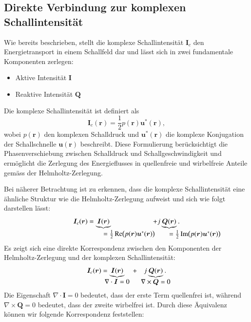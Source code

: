 \subsection{Direkte Verbindung zur komplexen Schallintensität
\label{helmholtz:subsection:Zerlegung_Schallschnelle}}
Wie bereits beschrieben, stellt die komplexe Schallintensität
$\boldsymbol{I}_c$ den Energietransport in einem Schallfeld dar und
lässt sich in zwei fundamentale Komponenten zerlegen:
\begin{itemize}
\item Aktive Intensität $\boldsymbol{I}$
\item Reaktive Intensität $\boldsymbol{Q}$
\end{itemize}
Die komplexe Schallintensität ist definiert als
\begin{equation}
\boldsymbol{I}_c (\boldsymbol{r})
=
\frac{1}{2} p(\boldsymbol{r})  \boldsymbol{u}^{*}(\boldsymbol{r}),
\end{equation}
wobei $p(\boldsymbol{r})$ den komplexen Schalldruck und $\boldsymbol{u}^{*}(\boldsymbol{r})$ die komplexe Konjugation der Schallschnelle $\boldsymbol{u}(\boldsymbol{r})$ beschreibt. Diese Formulierung berücksichtigt die Phasenverschiebung zwischen Schalldruck und Schallgeschwindigkeit und ermöglicht die Zerlegung des Energieflusses in quellenfreie und wirbelfreie Anteile gemäss der Helmholtz-Zerlegung.
 
Bei näherer Betrachtung ist zu erkennen, dass die komplexe Schallintensität eine ähnliche Struktur wie die Helmholtz-Zerlegung aufweist und sich wie folgt darstellen lässt:
\begin{equation}
\boldsymbol{I}_c (\boldsymbol{r})
=
\underbrace{
\boldsymbol{I}(\boldsymbol{r})
}_{\mathstrut
\rlap{$
=\textstyle\frac{1}{2}
\operatorname{Re} \bigl( p(\boldsymbol{r}) \boldsymbol{u}^*(\boldsymbol{r}) \bigr)
$}
}
\qquad\qquad
\qquad
+
j\underbrace{
\boldsymbol{Q}(\boldsymbol{r})
}_{\mathstrut
\rlap{$\textstyle
=\frac{1}{2}
\operatorname{Im} \bigl( p(\boldsymbol{r}) \boldsymbol{u}^*(\boldsymbol{r}) \bigr)
$}}.
\end{equation}
Es zeigt sich eine direkte Korrespondenz zwischen den Komponenten der Helmholtz-Zerlegung und der komplexen Schallintensität:
\begin{equation}
\boldsymbol{I}_c (\boldsymbol{r})
=
\underbrace{
\boldsymbol{I}(\boldsymbol{r})
}_{
\clap{$\displaystyle\nabla \cdot \boldsymbol{I} = 0$}
}
\quad
+
\quad
j
\underbrace{
\boldsymbol{Q}(\boldsymbol{r})
}_{
\clap{$\displaystyle\nabla \times \boldsymbol{Q} = 0$}
}.
\end{equation}
Die Eigenschaft $\nabla\cdot\boldsymbol{I}=0$ bedeutet,
dass der erste Term quellenfrei ist, während $\nabla\times\boldsymbol{Q}=0$
bedeutet, dass der zweite wirbelfrei ist.
Durch diese Äquivalenz können wir folgende Korrespondenz feststellen:
 
